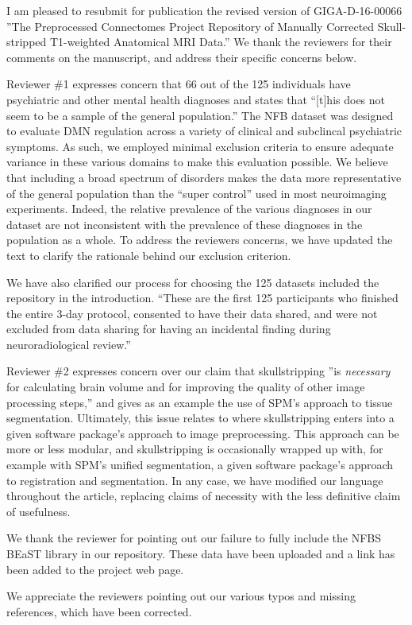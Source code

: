\documentclass{article}
\begin{document}
\sffamily

I am pleased to resubmit for publication the revised version of GIGA-D-16-00066 ''The Preprocessed Connectomes Project Repository of Manually Corrected Skull-stripped T1-weighted Anatomical MRI Data.''  We thank the reviewers for their comments on the manuscript, and address their specific concerns below.

Reviewer \#1 expresses concern that 66 out of the 125 individuals have psychiatric and other mental health diagnoses and states that ``[t]his does not seem to be a sample of the general population.'' The NFB dataset was designed to evaluate DMN regulation across a variety of clinical and subclincal psychiatric symptoms. As such, we employed minimal exclusion criteria to ensure adequate variance in these various domains to make this evaluation possible. We believe that including a broad spectrum of disorders makes the data more representative of the general population than the ``super control'' used in most neuroimaging experiments. Indeed, the relative prevalence of the various diagnoses in our dataset are not inconsistent with the prevalence of these diagnoses in the population as a whole. To address the reviewers concerns, we have updated the text to clarify the rationale behind our exclusion criterion. 

We have also clarified our process for choosing the 125 datasets included the repository in the introduction. ``These are the first 125 participants who finished the entire 3-day protocol, consented to have their data shared, and were not excluded from data sharing for having an incidental finding during neuroradiological review.''

Reviewer \#2 expresses concern over our claim that skullstripping ''is {\em necessary} for calculating brain volume and for improving the quality of other image processing steps,'' and gives as an example the use of SPM's approach to tissue segmentation. Ultimately, this issue relates to where skullstripping enters into a given software package's approach to image preprocessing. This approach can be more or less modular, and skullstripping is occasionally wrapped up with, for example with SPM's unified segmentation, a given software package's approach to registration and segmentation. In any case, we have modified our language throughout the article, replacing claims of necessity with the less definitive claim of usefulness.

We thank the reviewer for pointing out our failure to fully include the NFBS BEaST library in our repository. These data have been uploaded and a link has been added to the project web page.

We appreciate the reviewers pointing out our various typos and missing references, which have been corrected.
\end{document}
